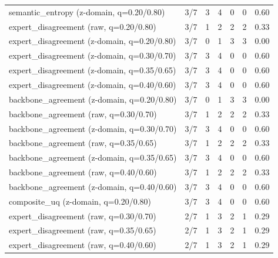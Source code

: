 \begin{tabular}{lcccccc}
semantic_entropy (z-domain, q=0.20/0.80) & 3/7 & 3 & 4 & 0 & 0 & 0.60 \\
expert_disagreement (raw, q=0.20/0.80) & 3/7 & 1 & 2 & 2 & 2 & 0.33 \\
expert_disagreement (z-domain, q=0.20/0.80) & 3/7 & 0 & 1 & 3 & 3 & 0.00 \\
expert_disagreement (z-domain, q=0.30/0.70) & 3/7 & 3 & 4 & 0 & 0 & 0.60 \\
expert_disagreement (z-domain, q=0.35/0.65) & 3/7 & 3 & 4 & 0 & 0 & 0.60 \\
expert_disagreement (z-domain, q=0.40/0.60) & 3/7 & 3 & 4 & 0 & 0 & 0.60 \\
backbone_agreement (z-domain, q=0.20/0.80) & 3/7 & 0 & 1 & 3 & 3 & 0.00 \\
backbone_agreement (raw, q=0.30/0.70) & 3/7 & 1 & 2 & 2 & 2 & 0.33 \\
backbone_agreement (z-domain, q=0.30/0.70) & 3/7 & 3 & 4 & 0 & 0 & 0.60 \\
backbone_agreement (raw, q=0.35/0.65) & 3/7 & 1 & 2 & 2 & 2 & 0.33 \\
backbone_agreement (z-domain, q=0.35/0.65) & 3/7 & 3 & 4 & 0 & 0 & 0.60 \\
backbone_agreement (raw, q=0.40/0.60) & 3/7 & 1 & 2 & 2 & 2 & 0.33 \\
backbone_agreement (z-domain, q=0.40/0.60) & 3/7 & 3 & 4 & 0 & 0 & 0.60 \\
composite_uq (z-domain, q=0.20/0.80) & 3/7 & 3 & 4 & 0 & 0 & 0.60 \\
expert_disagreement (raw, q=0.30/0.70) & 2/7 & 1 & 3 & 2 & 1 & 0.29 \\
expert_disagreement (raw, q=0.35/0.65) & 2/7 & 1 & 3 & 2 & 1 & 0.29 \\
expert_disagreement (raw, q=0.40/0.60) & 2/7 & 1 & 3 & 2 & 1 & 0.29 \\
\bottomrule
\end{tabular}
